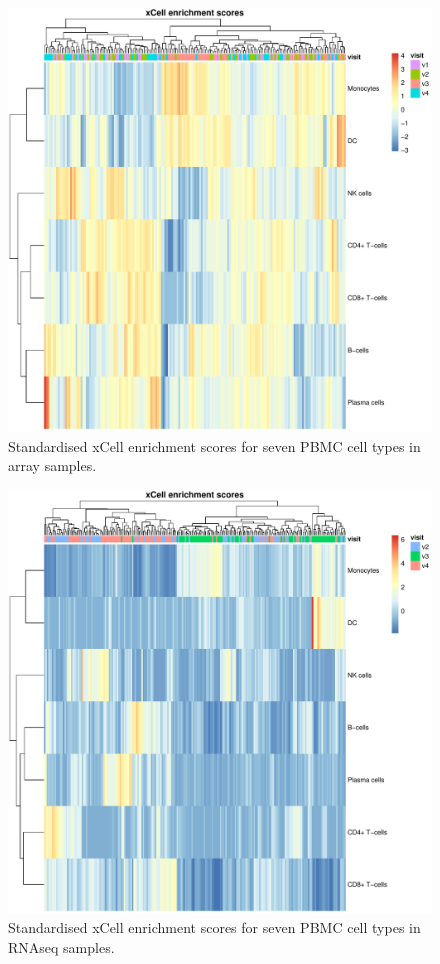 \begin{figure}
    \centering
    \includegraphics[width=1.0\textwidth,page=1]{mainmatter/figures/chapter_03/get_xCell_estimates.dataset_array.plots.pdf}
    \caption{Standardised xCell enrichment scores for seven \gls{PBMC} cell types in array samples.}
    \label{fig:hird_xCell_scores_heatmap_array}
\end{figure}

\begin{figure}
    \centering
    \includegraphics[width=1.0\textwidth,page=1]{mainmatter/figures/chapter_03/get_xCell_estimates.dataset_rnaseq.plots.pdf}
    \caption{Standardised xCell enrichment scores for seven \gls{PBMC} cell types in \gls{RNAseq} samples.}
    \label{fig:hird_xCell_scores_heatmap_rnaseq}
\end{figure}

